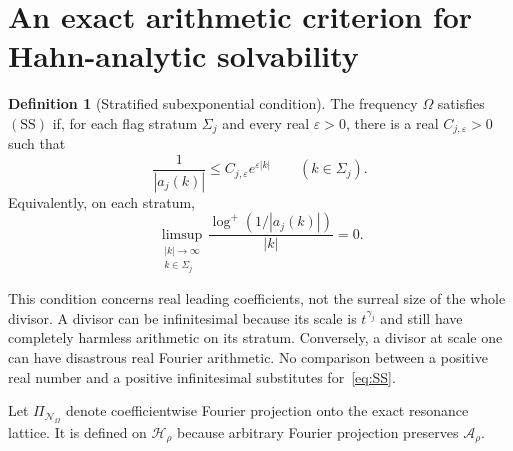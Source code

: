 \documentclass[11pt,letterpaper]{article}
\theoremstyle{definition}
\newtheorem{definition}[theorem]{Definition}
\theoremstyle{remark}
\newcommand{\A}{\mathcal A}
\newcommand{\HH}{\mathcal H}
\newcommand{\res}{\mathcal N_{\Omega}}
\newcommand{\SDcond}{\mathrm{SS}}
\newcommand{\eps}{\varepsilon}
\numberwithin{equation}{section}
\begin{document}
\section{An exact arithmetic criterion for Hahn-analytic solvability}
\label{sec:linear}

\begin{definition}[Stratified subexponential condition]\label{def:SS}
The frequency $\Omega$ satisfies $(\SDcond)$ if, for each flag stratum
$\Sigma_j$ and every real $\eps>0$, there is a real $C_{j,\eps}>0$ such that
\begin{equation}\label{eq:SS}
 \frac1{|a_j(k)|}\le C_{j,\eps}e^{\eps|k|}
 \qquad(k\in\Sigma_j).
\end{equation}
Equivalently, on each stratum,
\[
 \limsup_{\substack{|k|\to\infty\\k\in\Sigma_j}}
 \frac{\log^+(1/|a_j(k)|)}{|k|}=0.
\]
\end{definition}

This condition concerns real leading coefficients, not the surreal size of
the whole divisor.  A divisor can be infinitesimal because its scale is
$t^{\gamma_j}$ and still have completely harmless arithmetic on its stratum.
Conversely, a divisor at scale one can have disastrous real Fourier
arithmetic.  No comparison between a positive real number and a positive
infinitesimal substitutes for~\eqref{eq:SS}.

Let $\Pi_{\res}$ denote coefficientwise Fourier projection onto the exact
resonance lattice.  It is defined on $\HH_\rho$ because arbitrary Fourier
projection preserves $\A_\rho$.
\end{document}
